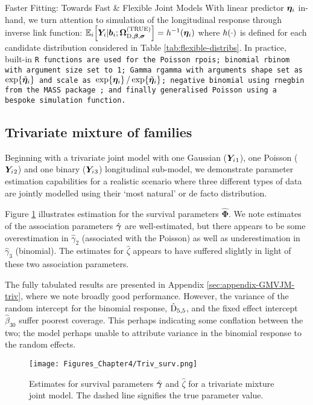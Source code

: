 \begin{chapter}{\label{cha:flexible}Faster Fitting: Towards Fast \& Flexible Joint Models}
With linear predictor $\bm{\eta}_i$ in-hand, we turn attention to simulation of the longitudinal response through inverse link function: $\mathbb{E}_i\!\left[\bm{Y}_i|\bm{b}_i; \bm{\mathrm{\Omega}}_{\mathrm{D},\bm{\beta},\bm{\sigma}}^{(\mathrm{TRUE})}\right]=h^{-1}\!\left(\bm{\eta}_i\right)$ where $h\!\left(\cdot\right)$ is defined for each candidate distribution considered in Table \ref{tab:flexible-distribs}. In practice, built-in \tt{R} functions are used for the Poisson \tt{rpois}; binomial \tt{rbinom} with argument \tt{size} set to 1; Gamma \tt{rgamma} with arguments \tt{shape} set as $\exp\!\left\{\tilde{\bm{\eta}}_{i}\right\}$ and \tt{scale} as $\exp\!\left\{\bm{\eta}_i\right\}/\exp\!\left\{\tilde{\bm{\eta}}_{i}\right\}$; negative binomial using \tt{rnegbin} from the \tt{MASS} package \citep{R-MASS}; and finally generalised Poisson using a bespoke simulation function.

\subsection{Trivariate mixture of families}\label{sec:flexible-sim-triv}
Beginning with a trivariate joint model with one Gaussian ($\bm{Y}_i{_1}$), one Poisson ($\bm{Y}_i{_2}$) and one binary ($\bm{Y}_i{_3}$) longitudinal sub-model, we demonstrate parameter estimation capabilities for a realistic scenario where three different types of data are jointly modelled using their `most natural' or de facto distribution.

Figure \ref{fig:flexible-sims-triv} illustrates estimation for the survival parameters $\hat{\bm{\Phi}}$. We note estimates of the association parameters $\hat{\bm{\gamma}}$ are well-estimated, but there appears to be some overestimation in $\hat{\gamma}_2$ (associated with the Poisson) as well as underestimation in $\hat{\gamma}_3$ (binomial). The estimates for $\hat{\zeta}$ appears to have suffered slightly in light of these two association parameters. 

The fully tabulated results are presented in Appendix \ref{sec:appendix-GMVJM-triv}, where we note broadly good performance. However, the variance of the random intercept for the binomial response, $\hat{\mathrm{D}}_{5,5}$, and the fixed effect intercept $\hat{\beta}_{30}$ suffer poorest coverage. This perhaps indicating some conflation between the two; the model perhaps unable to attribute variance in the binomial response to the random effects.

\begin{figure}
    \centering
    \texttt{[image: Figures\_Chapter4/Triv\_surv.png]}
    \caption{Estimates for survival parameters $\hat{\bm{\gamma}}$ and $\hat{\zeta}$ for a trivariate mixture joint model. The dashed line signifies the true parameter value.}
    \label{fig:flexible-sims-triv}
\end{figure}


\end{chapter}
